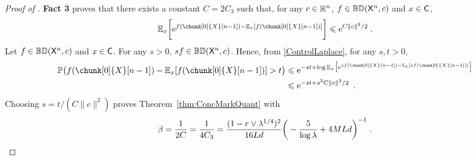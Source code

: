 \documentclass[leqno,11pt,a4paper]{article}
\begin{document}
\begin{proof}[Proof of ]
\noindent
{\bf Fact 3} proves that there exists a constant $C=2C_3$ such that, for any $c\in \mathbb{R}^n$, $f\in \mathbb{BD}(\mathsf{X}^n,c)$ and $x\in \mathsf{C}$,
\begin{equation}\label{ControlLaplace}
 \Ebb_x\bigg[\rme^{f(\chunk[0]{X}[n-1])-\Ebb_x[f(\chunk[0]{X}[n-1])]}\bigg]\leqslant \rme^{C\| c\|^2/2}
\eqsp .
\end{equation}
Let $f\in \mathbb{BD}(\mathsf{X}^n,c)$ and $x\in \mathsf{C}$. 
For any $s>0$, $sf\in \mathbb{BD}(\mathsf{X}^n,c)$.
Hence, from \eqref{ControlLaplace}, for any $s,t>0$,
\begin{align*}
 \Pbb\big(f(\chunk[0]{X}[n-1])-\Ebb_x[f(\chunk[0]{X}[n-1])]>t\big)&\leqslant \rme^{-st+\log\Ebb_x\big[\rme^{sf(\chunk[0]{X}[n-1])-\Ebb_x[sf(\chunk[0]{X}[n-1])]}\big]}\\
 &\leqslant \rme^{-st+s^2C\| c\|^2/2}\enspace.
\end{align*}
Choosing $s=t/(C\|c\|^2)$ proves Theorem~\ref{thm:ConcMarkQuant} with
\[
\beta=\frac1{2C}=\frac1{4C_3}=\frac{(1-r\vee \lambda^{1/4})^2}{16Ld}\bigg(-\frac5{\log \lambda}+4MLd\bigg)^{-1}\;.
\]
\end{proof}
\end{document}
